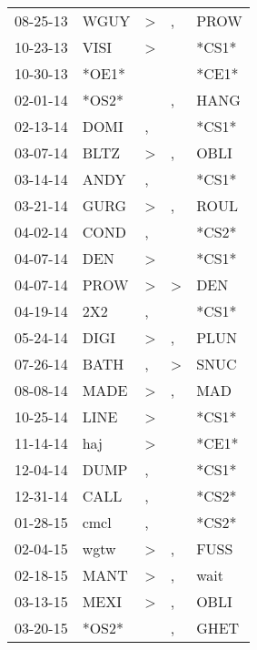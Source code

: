 \begin{supertabular}{lllll}
 08-25-13 &   WGUY &     \textgreater &                , &   PROW \\
 10-23-13 &   VISI &     \textgreater &                  &  *CS1* \\
 10-30-13 &  *OE1* &                  &                  &  *CE1* \\
 02-01-14 &  *OS2* &                  &                , &   HANG \\
 02-13-14 &   DOMI &                , &                  &  *CS1* \\
 03-07-14 &   BLTZ &     \textgreater &                , &   OBLI \\
 03-14-14 &   ANDY &                , &                  &  *CS1* \\
 03-21-14 &   GURG &     \textgreater &                , &   ROUL \\
 04-02-14 &   COND &                , &                  &  *CS2* \\
 04-07-14 &    DEN &     \textgreater &                  &  *CS1* \\
 04-07-14 &   PROW &     \textgreater &     \textgreater &    DEN \\
 04-19-14 &    2X2 &                , &                  &  *CS1* \\
 05-24-14 &   DIGI &     \textgreater &                , &   PLUN \\
 07-26-14 &   BATH &                , &     \textgreater &   SNUC \\
 08-08-14 &   MADE &     \textgreater &                , &    MAD \\
 10-25-14 &   LINE &     \textgreater &                  &  *CS1* \\
 11-14-14 &    haj &     \textgreater &                  &  *CE1* \\
 12-04-14 &   DUMP &                , &                  &  *CS1* \\
 12-31-14 &   CALL &                , &                  &  *CS2* \\
 01-28-15 &   cmcl &                , &                  &  *CS2* \\
 02-04-15 &   wgtw &     \textgreater &                , &   FUSS \\
 02-18-15 &   MANT &     \textgreater &                , &   wait \\
 03-13-15 &   MEXI &     \textgreater &                , &   OBLI \\
 03-20-15 &  *OS2* &                  &                , &   GHET \\

\end{supertabular}

